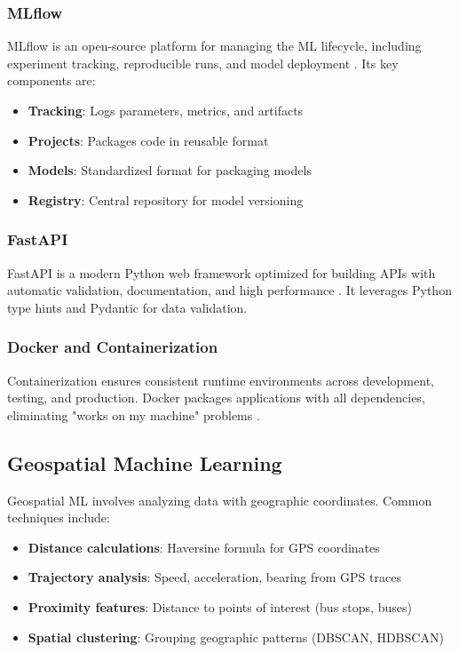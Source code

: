 \subsubsection{MLflow}
MLflow is an open-source platform for managing the ML lifecycle, including experiment tracking, reproducible runs, and model deployment \cite{zaharia2018mlflow}. Its key components are:
\begin{itemize}
    \item \textbf{Tracking}: Logs parameters, metrics, and artifacts
    \item \textbf{Projects}: Packages code in reusable format
    \item \textbf{Models}: Standardized format for packaging models
    \item \textbf{Registry}: Central repository for model versioning
\end{itemize}

\subsubsection{FastAPI}
FastAPI is a modern Python web framework optimized for building APIs with automatic validation, documentation, and high performance \cite{fastapi2021}. It leverages Python type hints and Pydantic for data validation.

\subsubsection{Docker and Containerization}
Containerization ensures consistent runtime environments across development, testing, and production. Docker packages applications with all dependencies, eliminating "works on my machine" problems \cite{merkel2014docker}.

\subsection{Geospatial Machine Learning}

Geospatial ML involves analyzing data with geographic coordinates. Common techniques include:

\begin{itemize}
    \item \textbf{Distance calculations}: Haversine formula for GPS coordinates
    \item \textbf{Trajectory analysis}: Speed, acceleration, bearing from GPS traces
    \item \textbf{Proximity features}: Distance to points of interest (bus stops, buses)
    \item \textbf{Spatial clustering}: Grouping geographic patterns (DBSCAN, HDBSCAN)
\end{itemize}

